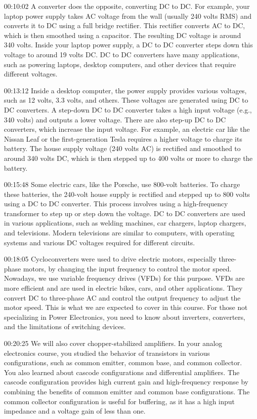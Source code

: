 00:10:02	A converter does the opposite, converting DC to DC. For example, your laptop power supply takes AC voltage from the wall (usually 240 volts RMS) and converts it to DC using a full bridge rectifier. This rectifier converts AC to DC, which is then smoothed using a capacitor. The resulting DC voltage is around 340 volts. Inside your laptop power supply, a DC to DC converter steps down this voltage to around 19 volts DC. DC to DC converters have many applications, such as powering laptops, desktop computers, and other devices that require different voltages.

00:13:12	Inside a desktop computer, the power supply provides various voltages, such as 12 volts, 3.3 volts, and others. These voltages are generated using DC to DC converters. A step-down DC to DC converter takes a high input voltage (e.g., 340 volts) and outputs a lower voltage. There are also step-up DC to DC converters, which increase the input voltage. For example, an electric car like the Nissan Leaf or the first-generation Tesla requires a higher voltage to charge its battery. The house supply voltage (240 volts AC) is rectified and smoothed to around 340 volts DC, which is then stepped up to 400 volts or more to charge the battery.

00:15:48	Some electric cars, like the Porsche, use 800-volt batteries. To charge these batteries, the 240-volt house supply is rectified and stepped up to 800 volts using a DC to DC converter. This process involves using a high-frequency transformer to step up or step down the voltage. DC to DC converters are used in various applications, such as welding machines, car chargers, laptop chargers, and televisions. Modern televisions are similar to computers, with operating systems and various DC voltages required for different circuits.

00:18:05	Cycloconverters were used to drive electric motors, especially three-phase motors, by changing the input frequency to control the motor speed. Nowadays, we use variable frequency drives (VFDs) for this purpose. VFDs are more efficient and are used in electric bikes, cars, and other applications. They convert DC to three-phase AC and control the output frequency to adjust the motor speed. This is what we are expected to cover in this course. For those not specializing in Power Electronics, you need to know about inverters, converters, and the limitations of switching devices.

00:20:25	We will also cover chopper-stabilized amplifiers. In your analog electronics course, you studied the behavior of transistors in various configurations, such as common emitter, common base, and common collector. You also learned about cascode configurations and differential amplifiers. The cascode configuration provides high current gain and high-frequency response by combining the benefits of common emitter and common base configurations. The common collector configuration is useful for buffering, as it has a high input impedance and a voltage gain of less than one.

